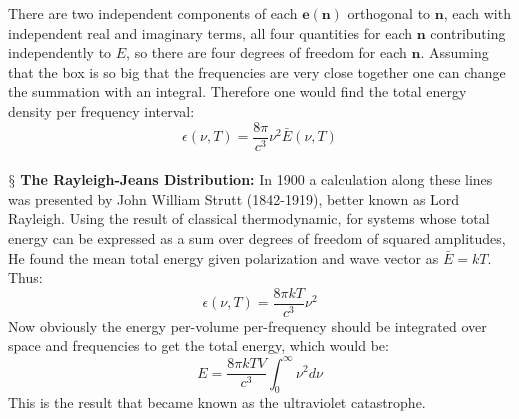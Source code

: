 \documentclass[9pt,a4paper, twocolumn]{article}
\newcommand{\newpoint}[1]{\ \\ \indent$\mathsection$ \textbf{#1}}
\newcommand{\vect}[1]{\textbf{#1}}
\begin{document}
        There are two independent components of each $\vect e(\vect n)$ orthogonal to $\vect n$, each with independent real and imaginary terms, all four quantities for each $\vect n$ contributing independently to $E$, so there are four degrees of freedom for each $\vect n$. Assuming that the box is so big that the frequencies are very close together one can change the summation with an integral. Therefore one would find the total energy density per frequency interval:
        \begin{equation}
            \epsilon(\nu, T) = \frac{8\pi}{c^3}\nu^2\bar E(\nu, T)
        \end{equation}
        \newpage
        \newpoint{The Rayleigh-Jeans Distribution:} In 1900 a calculation along these lines was presented by John William Strutt (1842-1919), better known as Lord Rayleigh. Using the result of classical thermodynamic, for systems whose total energy can be expressed as a sum over degrees of freedom of squared amplitudes, He found the mean total energy given polarization and wave vector as $\bar E = kT$. Thus:
        \begin{equation}
            \epsilon(\nu, T) = \frac{8\pi kT}{c^3}\nu^2
        \end{equation}
        Now obviously the energy per-volume per-frequency should be integrated over space and frequencies to get the total energy, which would be:
        \begin{equation}
            E = \frac{8\pi kTV}{c^3}\int_0^\infty \nu^2d\nu
        \end{equation}
        This is the result that became known as the ultraviolet catastrophe.
\end{document}
